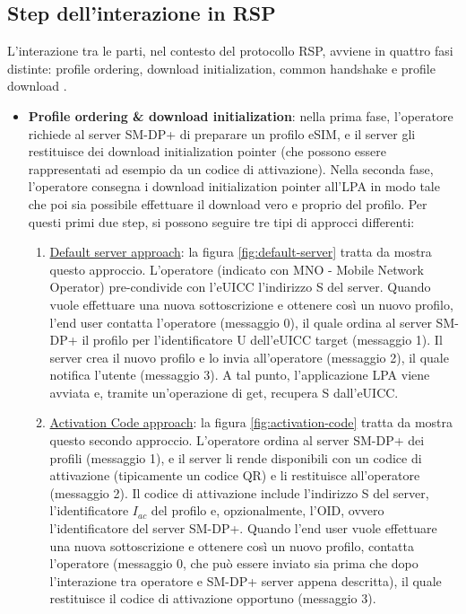 \documentclass[10pt, oneside]{book}
\begin{document}
\subsection{Step dell'interazione in RSP}\label{sec:step-RSP}
L'interazione tra le parti, nel contesto del protocollo RSP, avviene in quattro fasi distinte: profile ordering, download initialization, common handshake e profile download \cite{Sec-analysis}.
\begin{itemize}
\item \textbf{Profile ordering \& download initialization}: nella prima fase, l'operatore richiede al server SM-DP+ di preparare un profilo eSIM, e il server gli restituisce dei download initialization pointer (che possono essere rappresentati ad esempio da un codice di attivazione). Nella seconda fase, l'operatore consegna i download initialization pointer all'LPA in modo tale che poi sia possibile effettuare il download vero e proprio del profilo. Per questi primi due step, si possono seguire tre tipi di approcci differenti:
\begin{enumerate}
\item \underline{Default server approach}: la figura \ref{fig:default-server} tratta da \cite{Sec-analysis} mostra questo approccio. L'operatore (indicato con MNO - Mobile Network Operator) pre-condivide con l'eUICC l'indirizzo S del server. Quando vuole effettuare una nuova sottoscrizione e ottenere così un nuovo profilo, l'end user contatta l'operatore (messaggio 0), il quale ordina al server SM-DP+ il profilo per l'identificatore U dell'eUICC target (messaggio 1). Il server crea il nuovo profilo e lo invia all'operatore (messaggio 2), il quale notifica l'utente (messaggio 3). A tal punto, l'applicazione LPA viene avviata e, tramite un'operazione di get, recupera S dall'eUICC.
\item \underline{Activation Code approach}: la figura \ref{fig:activation-code} tratta da \cite{Sec-analysis} mostra questo secondo approccio. L'operatore ordina al server SM-DP+ dei profili (messaggio 1), e il server li rende disponibili con un codice di attivazione (tipicamente un codice QR) e li restituisce all'operatore (messaggio 2). Il codice di attivazione include l'indirizzo S del server, l'identificatore $I_{ac}$ del profilo e, opzionalmente, l'OID, ovvero l'identificatore del server SM-DP+. Quando l'end user vuole effettuare una nuova sottoscrizione e ottenere così un nuovo profilo, contatta l'operatore (messaggio 0, che può essere inviato sia prima che dopo l'interazione tra operatore e SM-DP+ server appena descritta), il quale restituisce il codice di attivazione opportuno (messaggio 3).

\end{enumerate}
\end{itemize}
\end{document}
